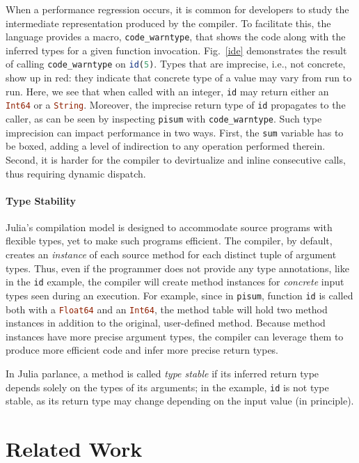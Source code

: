 \documentclass[oneside,openright,titlepage,numbers=noenddot,%
headinclude,footinclude,cleardoublepage=empty,abstract=on,
BCOR=5mm,paper=a4,fontsize=11pt,
dvipsnames
]{scrreprt}
\renewcommand{\c}[1]{\lstinline[language=Julia]!#1!\xspace}
\begin{document}
When a performance regression occurs, it is common for developers to study the
intermediate representation produced by the compiler. To facilitate this, the
language provides a macro, \c{code_warntype}, that shows the code along with the
inferred types for a given function invocation. Fig.~\ref{ide} demonstrates the result of
calling \c{code_warntype} on \c{id(5)}. Types that are imprecise, i.e., not
concrete, show up in red: they indicate that concrete type of a value may vary
from run to run. Here, we see that when called with an integer,
\c{id} may return either an
\c{Int64} or a \c{String}.
Moreover, the imprecise return type of \c{id} propagates to the caller,
as can be seen by inspecting \c{pisum} with \c{code_warntype}.
%
Such type imprecision can impact performance in two ways. First,
the \c{sum} variable has to be boxed, adding a level of indirection to
any operation performed therein. Second, it is harder for
the compiler to devirtualize and inline consecutive calls, thus requiring
dynamic dispatch.

\paragraph{Type Stability}
Julia's compilation model is designed to accommodate source programs
with flexible types, yet to make such programs efficient. The compiler, by
default, creates an \emph{instance} of each source method for each distinct tuple of
argument types. Thus, even if the programmer does not provide any type
annotations, like in the \c{id} example, the compiler will create method
instances for \emph{concrete} input types seen during
an execution. For example, since in \c{pisum}, function \c{id} is called both
with a \c{Float64} and an \c{Int64}, the method table will hold two method instances
in addition to the original, user-defined method.
Because method instances have more precise argument types, the compiler can
leverage them to produce more efficient code and infer more precise return types.

In Julia parlance, a method is called \emph{type stable} if its inferred
return type depends solely on the types of its arguments; in the
example, \c{id} is not type stable, as its return type may change depending on
the input value (in principle).


\section{Related Work}%
\label{sec-related}
\end{document}
